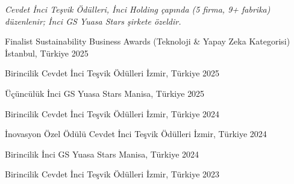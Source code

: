 
{\scriptsize\itshape\color{graytext}Cevdet İnci Teşvik Ödülleri, İnci Holding çapında (5 firma, 9+ fabrika) düzenlenir; İnci GS Yuasa Stars şirkete özeldir.\par}
\vspace{-1mm}

\begin{cvhonors}

  \cvhonor
    {Finalist} %
    {Sustainability Business Awards (Teknoloji \& Yapay Zeka Kategorisi)} %
    {İstanbul, Türkiye} %
    {2025} %

  \cvhonor
    {Birincilik} %
    {Cevdet İnci Teşvik Ödülleri} %
    {İzmir, Türkiye} %
    {2025} %

  \cvhonor
    {Üçüncülük} %
    {İnci GS Yuasa Stars} %
    {Manisa, Türkiye} %
    {2025} %

  \cvhonor
    {Birincilik} %
    {Cevdet İnci Teşvik Ödülleri} %
    {İzmir, Türkiye} %
    {2024} %

  \cvhonor
    {İnovasyon Özel Ödülü} %
    {Cevdet İnci Teşvik Ödülleri} %
    {İzmir, Türkiye} %
    {2024} %

  \cvhonor
    {Birincilik} %
    {İnci GS Yuasa Stars} %
    {Manisa, Türkiye} %
    {2024} %

  \cvhonor
    {Birincilik} %
    {Cevdet İnci Teşvik Ödülleri} %
    {İzmir, Türkiye} %
    {2023} %

\end{cvhonors}
